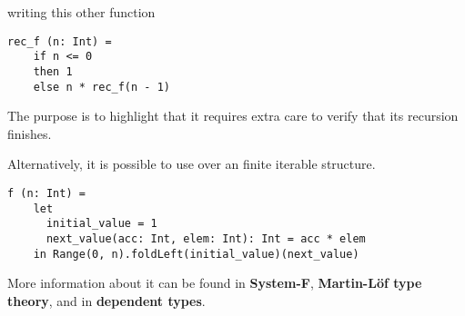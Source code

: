 writing this other function
\begin{lstlisting}[label={lst:exampleOfFactorialGoodNaming}]
  rec_f (n: Int) =
    if n <= 0
    then 1
    else n * rec_f(n - 1)
\end{lstlisting}

The purpose is to highlight that it requires extra care to verify that its recursion finishes.

Alternatively, it is possible to use  over an finite iterable structure.
\begin{lstlisting}[label={lst:exampleOfFactorialFoldLeft}]
  f (n: Int) =
    let
      initial_value = 1
      next_value(acc: Int, elem: Int): Int = acc * elem
    in Range(0, n).foldLeft(initial_value)(next_value)
\end{lstlisting}

More information about it can be found in \textbf{System-F}, \textbf{Martin-L\"{o}f type theory}, and in \textbf{dependent types}.
